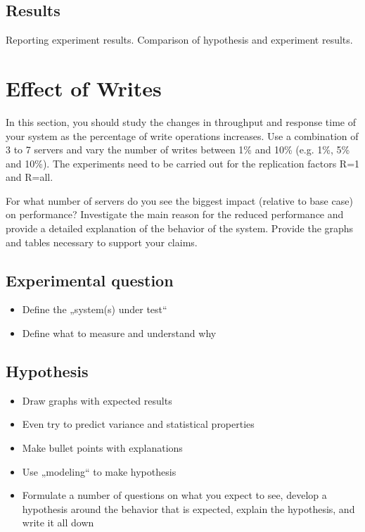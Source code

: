 \documentclass[11pt]{article}
\begin{document}
\subsection{Results}
Reporting experiment results. Comparison of hypothesis and experiment results.
 
\section{Effect of Writes}

In this section, you should study the changes in throughput and response time of your system as the percentage of write operations increases. Use a combination of 3 to 7 servers and vary the number of writes between 1\% and 10\% (e.g. 1\%, 5\% and 10\%). The experiments need to be carried out for the replication factors R=1 and R=all.  

For what number of servers do you see the biggest impact (relative to base case) on performance? Investigate the main reason for the reduced performance and provide a detailed explanation of the behavior of the system. Provide the graphs and tables necessary to support your claims.


\subsection{Experimental question}
\begin{itemize}
\item Define the „system(s) under test“
\item Define what to measure and understand why
\end{itemize}

\subsection{Hypothesis}
\begin{itemize}
\item Draw graphs with expected results
\item Even try to predict variance and statistical properties
\item Make bullet points with explanations
\item Use „modeling“ to make hypothesis
\item Formulate a number of questions on what you expect to see, develop a hypothesis around the behavior that is expected, explain the hypothesis, and write it all down
\end{itemize}
\end{document}
